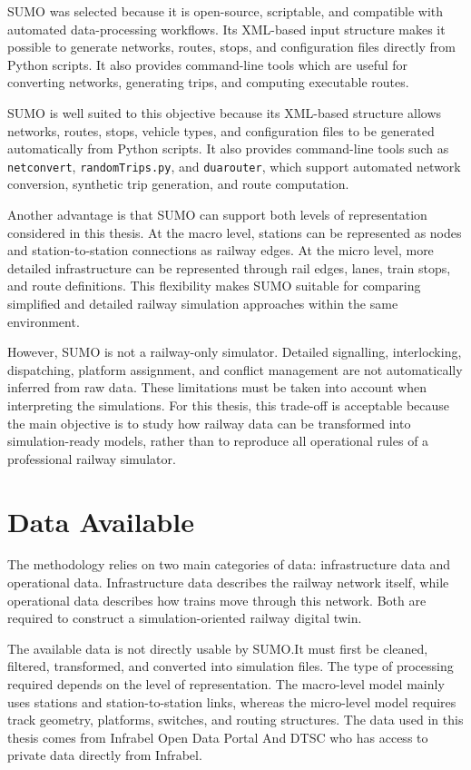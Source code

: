 SUMO was selected because it is open-source, scriptable, and compatible with automated data-processing workflows. Its 
XML-based input structure makes it possible to generate networks, routes, stops, and configuration files directly from 
Python scripts. It also provides command-line tools which are useful for converting networks, generating trips, and 
computing executable routes.

SUMO is well suited to this objective because its XML-based structure allows networks, routes, stops, vehicle types, and 
configuration files to be generated automatically from Python scripts. It also provides command-line tools such as 
\texttt{netconvert}, \texttt{randomTrips.py}, and \texttt{duarouter}, which support automated network conversion, 
synthetic trip generation, and route computation.

Another advantage is that SUMO can support both levels of representation considered in this thesis. At the macro level, 
stations can be represented as nodes and station-to-station connections as railway edges. At the micro level, more 
detailed infrastructure can be represented through rail edges, lanes, train stops, and route definitions. This flexibility 
makes SUMO suitable for comparing simplified and detailed railway simulation approaches within the same environment.

However, SUMO is not a railway-only simulator. Detailed signalling, interlocking, dispatching, platform assignment, and 
conflict management are not automatically inferred from raw data. These limitations must be taken into account when 
interpreting the simulations. For this thesis, this trade-off is acceptable because the main objective is to study how 
railway data can be transformed into simulation-ready models, rather than to reproduce all operational rules of a 
professional railway simulator.

\section{Data Available}
The methodology relies on two main categories of data: infrastructure data and operational data. Infrastructure data 
describes the railway network itself, while operational data describes how trains move through this network. Both are 
required to construct a simulation-oriented railway digital twin.

The available data is not directly usable by SUMO.\@ It must first be cleaned, filtered, transformed, and converted into 
simulation files. The type of processing required depends on the level of representation. The macro-level model mainly 
uses stations and station-to-station links, whereas the micro-level model requires track geometry, platforms, switches, 
and routing structures. The data used in this thesis comes from Infrabel Open Data Portal And DTSC who has access to 
private data directly from Infrabel. 

